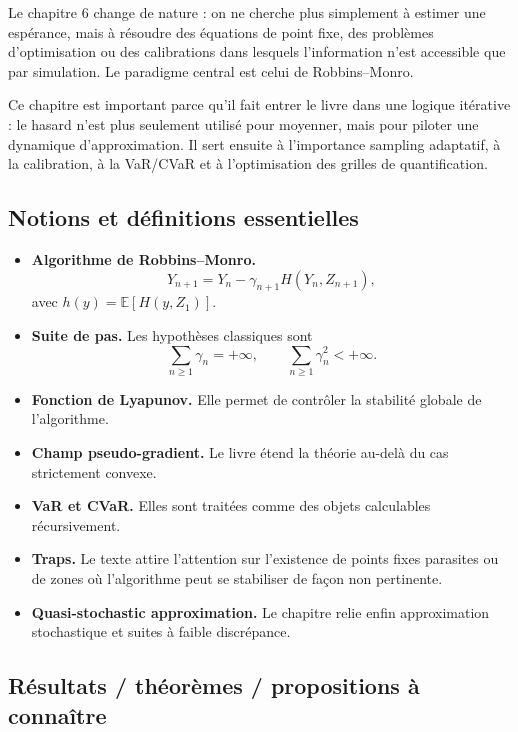 \documentclass[11pt,a4paper]{article}
\newcommand{\E}{\mathbb{E}}
\begin{document}
Le chapitre 6 change de nature : on ne cherche plus simplement à estimer une espérance, mais à résoudre des équations de point fixe, des problèmes d'optimisation ou des calibrations dans lesquels l'information n'est accessible que par simulation. Le paradigme central est celui de Robbins--Monro.

Ce chapitre est important parce qu'il fait entrer le livre dans une logique itérative : le hasard n'est plus seulement utilisé pour moyenner, mais pour piloter une dynamique d'approximation. Il sert ensuite à l'importance sampling adaptatif, à la calibration, à la VaR/CVaR et à l'optimisation des grilles de quantification.

\subsection{Notions et définitions essentielles}

\begin{itemize}
  \item \textbf{Algorithme de Robbins--Monro.}
  \[
    Y_{n+1}=Y_n-\gamma_{n+1}H(Y_n,Z_{n+1}),
  \]
  avec $h(y)=\E[H(y,Z_1)]$.
  \item \textbf{Suite de pas.} Les hypothèses classiques sont
  \[
    \sum_{n\ge1}\gamma_n=+\infty,\qquad \sum_{n\ge1}\gamma_n^2<+\infty.
  \]
  \item \textbf{Fonction de Lyapunov.} Elle permet de contrôler la stabilité globale de l'algorithme.
  \item \textbf{Champ pseudo-gradient.} Le livre étend la théorie au-delà du cas strictement convexe.
  \item \textbf{VaR et CVaR.} Elles sont traitées comme des objets calculables récursivement.
  \item \textbf{Traps.} Le texte attire l'attention sur l'existence de points fixes parasites ou de zones où l'algorithme peut se stabiliser de façon non pertinente.
  \item \textbf{Quasi-stochastic approximation.} Le chapitre relie enfin approximation stochastique et suites à faible discrépance.
\end{itemize}

\subsection{Résultats / théorèmes / propositions à connaître}
\end{document}
